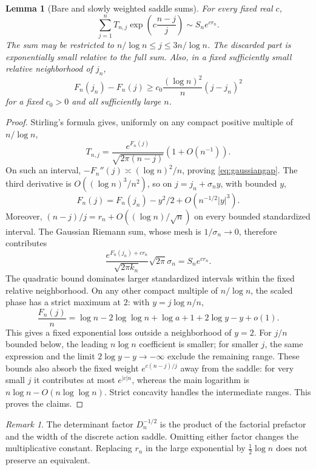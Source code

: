 \documentclass[11pt,a4paper]{article}
\numberwithin{equation}{section}
\newtheorem{lemma}[theorem]{Lemma}
\theoremstyle{definition}\newtheorem{definition}[theorem]{Definition}
\theoremstyle{remark}\newtheorem{remark}[theorem]{Remark}
\theoremstyle{definition}
\begin{document}
\begin{lemma}[Bare and slowly weighted saddle sums]
\label{lem:bare}
For every fixed real \(c\),
\begin{equation}
 \sum_{j=1}^nT_{n,j}\exp\!\left(c\frac{n-j}{j}\right)
 \sim S_ne^{cr_n}.
 \label{eq:weightedbare}
\end{equation}
The sum may be restricted to \(n/\log n\le j\le3n/\log n\).
The discarded part is exponentially small relative to the full sum.
Also, in a fixed sufficiently small relative neighborhood of \(j_n\),
\begin{equation}
 F_n(j_n)-F_n(j)\ge c_0\frac{(\log n)^2}{n}(j-j_n)^2
 \label{eq:gaussiangap}
\end{equation}
for a fixed \(c_0>0\) and all sufficiently large \(n\).
\end{lemma}
\begin{proof}
Stirling's formula gives, uniformly on any compact positive multiple of
\(n/\log n\),
\[
 T_{n,j}=\frac{e^{F_n(j)}}{\sqrt{2\pi(n-j)}}(1+O(n^{-1})).
\]
On such an interval, \(-F_n''(j)\asymp(\log n)^2/n\), proving
\eqref{eq:gaussiangap}. The third derivative is
\(O((\log n)^3/n^2)\), so on \(j=j_n+\sigma_n y\), with bounded \(y\),
\[
 F_n(j)=F_n(j_n)-y^2/2+O(n^{-1/2}|y|^3).
\]
Moreover, \((n-j)/j=r_n+O((\log n)/\sqrt n)\) on every bounded
standardized interval. The Gaussian Riemann sum, whose mesh is
\(1/\sigma_n\to0\), therefore contributes
\[
 \frac{e^{F_n(j_n)+cr_n}}{\sqrt{2\pi k_n}}
 \sqrt{2\pi}\sigma_n
 =S_ne^{cr_n}.
\]
The quadratic bound dominates larger standardized intervals within the
fixed relative neighborhood. On any other compact multiple of
\(n/\log n\), the scaled phase has a strict maximum at \(2\): with
\(y=j\log n/n\),
\[
 \frac{F_n(j)}n=\log n-2\log\log n+\log a+1+2\log y-y+o(1).
\]
This gives a fixed exponential loss outside a neighborhood of \(y=2\).
For \(j/n\) bounded below, the leading \(n\log n\) coefficient is smaller;
for smaller \(j\), the same expression and the limit \(2\log y-y\to-\infty\)
exclude the remaining range. These bounds also absorb the fixed weight
\(e^{c(n-j)/j}\) away from the saddle: for very small \(j\) it contributes
at most \(e^{|c|n}\), whereas the main logarithm is \(n\log n-O(n\log\log n)\).
Strict concavity handles the intermediate ranges. This proves the claims.
\end{proof}

\begin{remark}
The determinant factor \(D_n^{-1/2}\) is the product of the factorial
prefactor and the width of the discrete action saddle. Omitting either
factor changes the multiplicative constant. Replacing \(r_n\) in the large
exponential by \(\tfrac12\log n\) does not preserve an equivalent.
\end{remark}
\end{document}
